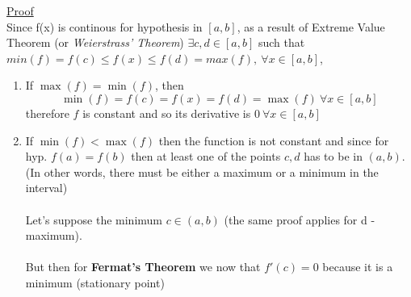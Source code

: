 \documentclass{book}
\newtheorem{theorem}{Theorem}[section]
\newcommand{\R}{\mathbb{R}}
\begin{document}
\begin{tcolorbox}[width=\textwidth,colback={mygray},title={{\bf Rolle's Theorem}\\\begin{theorem} Let $f(x)$ be a function $f: [a,b]\to \R$, continous in $[a,b]$, differentiable in $(a,b)$ and such that $f(a)=f(b)$. Therefore 
$$\exists c \in (a,b) \ \textrm{s.t.} \ f'(c)=0$$

\end{theorem}},colbacktitle=myblue,coltitle=black]    

\underline{Proof}\\
Since f(x) is continous for hypothesis in $[a,b]$, as a result of Extreme Value Theorem (or \textit{Weierstrass' Theorem}) $\exists c,d \in [a,b]$ such that $min(f)=f(c)\le f(x)\le f(d)=max(f), \ \forall x\in [a,b]$,

\begin{enumerate}
    \item If $\max(f)=\min(f)$, then $$\min(f)=f(c)=f(x)=f(d)=\max(f) \ \forall x \in [a,b]$$ therefore $f$ is constant and so its derivative is $0 \ \forall x \in [a,b]$ 
    \item If $\min(f)<\max(f)$ then the function is not constant and since for hyp. $f(a)=f(b)$ then at least one of the points $c,d$ has to be in $(a,b)$. (In other words, there must be either a maximum or a minimum in the interval)
    \\ 
    \\ Let's suppose the minimum $c\in (a,b)$ (the same proof applies for d - maximum).
    \\ 
    \\ But then for \textbf{Fermat's Theorem} we now that $f'(c)=0$ because it is a minimum (stationary point)
    
\end{enumerate}



\end{tcolorbox}
\end{document}
